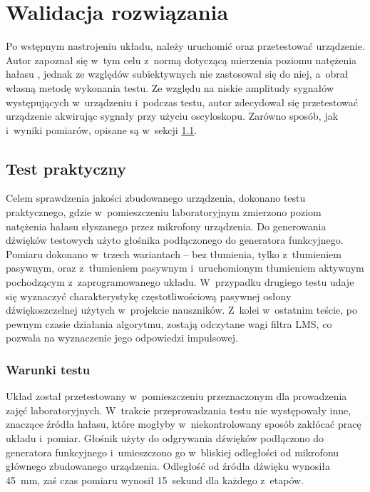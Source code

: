 \chapter{Walidacja rozwiązania}
\label{cha:tests}
Po wstępnym nastrojeniu układu, należy uruchomić oraz przetestować urządzenie. Autor zapoznał się w~tym celu z~normą dotyczącą mierzenia poziomu natężenia hałasu \cite{test_norm}, jednak ze względów subiektywnych nie zastosował się do niej, a~obrał własną metodę wykonania testu. Ze względu na niskie amplitudy sygnałów występujących w~urządzeniu i~podczas testu, autor zdecydował się przetestować urządzenie akwirując sygnały przy użyciu oscyloskopu. Zarówno sposób, jak i~wyniki pomiarów, opisane są w~sekcji \ref{sec:practical_test}.
\section{Test praktyczny}
\label{sec:practical_test}
Celem sprawdzenia jakości zbudowanego urządzenia, dokonano testu praktycznego, gdzie w~pomieszczeniu laboratoryjnym zmierzono poziom natężenia hałasu słyszanego przez mikrofony urządzenia. Do generowania dźwięków testowych użyto głośnika podłączonego do generatora funkcyjnego. Pomiaru dokonano w~trzech wariantach -- bez tłumienia, tylko z~tłumieniem pasywnym, oraz z~tłumieniem pasywnym i~uruchomionym tłumieniem aktywnym pochodzącym z~zaprogramowanego układu. W~przypadku drugiego testu udaje się wyznaczyć charakterystykę częstotliwościową pasywnej osłony dźwiękoszczelnej użytych w~projekcie nauszników. Z~kolei w~ostatnim teście, po pewnym czasie działania algorytmu, zostają odczytane wagi filtra LMS, co pozwala na wyznaczenie jego odpowiedzi impulsowej.
\subsection{Warunki testu}
\label{subsec:circumstances}
Układ został przetestowany w~pomieszczeniu przeznaczonym dla prowadzenia zajęć laboratoryjnych. W~trakcie przeprowadzania testu nie występowały inne, znaczące źródła hałasu, które mogłyby w~niekontrolowany sposób zakłócać pracę układu i~pomiar. Głośnik użyty do odgrywania dźwięków podłączono do generatora funkcyjnego i~umieszczono go w~bliskiej odległości od mikrofonu głównego zbudowanego urządzenia. Odległość od źródła dźwięku wynosiła \SI{45}{\mm}, zaś czas pomiaru wynosił 15~sekund dla każdego z~etapów.
